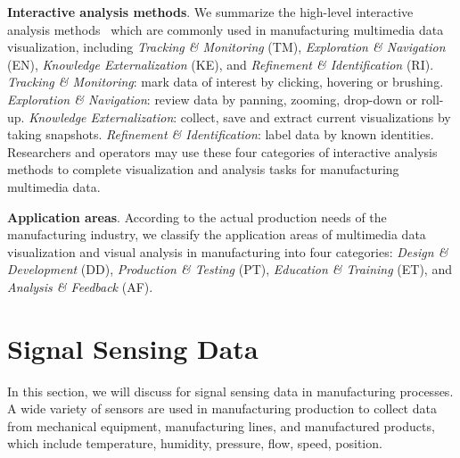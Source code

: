\documentclass[a4paper,fleqn]{cas-dc}
\begin{document}
\textbf{Interactive analysis methods}. 
We summarize the high-level interactive analysis methods~\cite{yi2007toward} which are commonly used in manufacturing multimedia data visualization, including \textit{Tracking \& Monitoring} (TM), \textit{Exploration \& Navigation} (EN), \textit{Knowledge Externalization} (KE), and \textit{Refinement \& Identification} (RI).
\textit{Tracking \& Monitoring}: mark data of interest by clicking, hovering or brushing.
\textit{Exploration \& Navigation}: review data by panning, zooming, drop-down or roll-up.
\textit{Knowledge Externalization}: collect, save and extract current visualizations by taking snapshots.
\textit{Refinement \& Identification}: label data by known identities.
Researchers and operators may use these four categories of interactive analysis methods to complete visualization and analysis tasks for manufacturing multimedia data.

\textbf{Application areas}. 
According to the actual production needs of the manufacturing industry, we classify the application areas of multimedia data visualization and visual analysis in manufacturing into four categories: \textit{Design \& Development} (DD), \textit{Production \& Testing} (PT), \textit{Education \& Training} (ET), and \textit{Analysis \& Feedback} (AF).

\section{Signal Sensing Data}
In this section, we will discuss for signal sensing data in manufacturing processes.
A wide variety of sensors are used in manufacturing production to collect data from mechanical equipment, manufacturing lines, and manufactured products, which include temperature, humidity, pressure, flow, speed, position.
\end{document}
